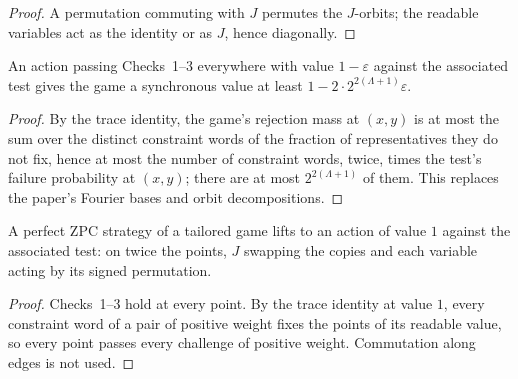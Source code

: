 \begin{proof}
\leanok
A permutation commuting with $J$ permutes the $J$-orbits; the readable variables act as the
identity or as $J$, hence diagonally.
\end{proof}

\begin{proposition}
\label{prop:checks-game-value}
\leanok
An action passing Checks~1--3 everywhere with value $1 - \varepsilon$ against the associated test
gives the game a synchronous value at least $1 - 2 \cdot 2^{2(\Lambda + 1)} \varepsilon$.
\end{proposition}

\begin{proof}
\leanok
By the trace identity, the game's rejection mass at $(x, y)$ is at most the sum over the distinct
constraint words of the fraction of representatives they do not fix, hence at most the number of
constraint words, twice, times the test's failure probability at $(x, y)$; there are at most
$2^{2(\Lambda + 1)}$ of them. This replaces the paper's Fourier bases and orbit decompositions.
\end{proof}

\begin{lemma}
\label{lem:assoc-completeness}
\leanok
A perfect ZPC strategy of a tailored game lifts to an action of value $1$ against the associated
test: on twice the points, $J$ swapping the copies and each variable acting by its signed
permutation.
\end{lemma}

\begin{proof}
\leanok
Checks~1--3 hold at every point. By the trace identity at value $1$, every constraint word of a
pair of positive weight fixes the points of its readable value, so every point passes every
challenge of positive weight. Commutation along edges is not used.
\end{proof}


